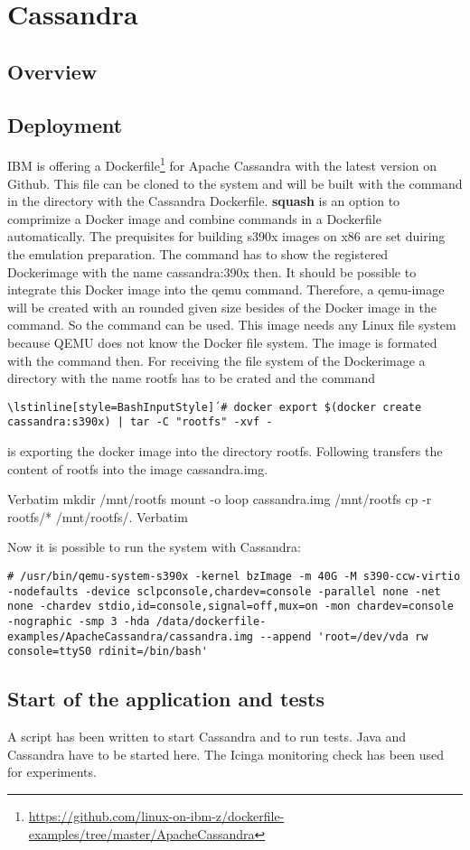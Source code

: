 \chapter{Cassandra}\label{ch:cassandra}

\section{Overview}

\section{Deployment}

IBM is offering a Dockerfile\footnote{\url{https://github.com/linux-on-ibm-z/dockerfile-examples/tree/master/ApacheCassandra}} for Apache Cassandra with the latest version on Github. This file can be cloned to the system and will be built with the command  in the directory with the Cassandra Dockerfile. \textbf{squash} is an option to comprimize a Docker image and combine commands in a Dockerfile automatically. The prequisites for building s390x images on x86 are set duiring the emulation preparation. The command  has to show the registered Dockerimage with the name cassandra:390x then. It should be possible to integrate this Docker image into the qemu command. Therefore, a qemu-image will be created with an rounded given size besides of the Docker image in the  command. So the command  can be used. This image needs any Linux file system because QEMU does not know the Docker file system. The image is formated with the command  then. For receiving the file system of the Dockerimage a directory with the name rootfs has to be crated and the command
\begin{lstlisting}[style=BashInputStyle]
\lstinline[style=BashInputStyle]´# docker export $(docker create cassandra:s390x) | tar -C "rootfs" -xvf -
 \end{lstlisting}
 is exporting the docker image into the directory rootfs. Following transfers the content of rootfs into the image cassandra.img.

{Verbatim}
mkdir /mnt/rootfs
mount -o loop cassandra.img /mnt/rootfs
cp -r rootfs/* /mnt/rootfs/.
{Verbatim}

Now it is possible to run the system with Cassandra: \\
\begin{lstlisting}[style=BashInputStyle]
 # /usr/bin/qemu-system-s390x -kernel bzImage -m 40G -M s390-ccw-virtio -nodefaults -device sclpconsole,chardev=console -parallel none -net none -chardev stdio,id=console,signal=off,mux=on -mon chardev=console -nographic -smp 3 -hda /data/dockerfile-examples/ApacheCassandra/cassandra.img --append 'root=/dev/vda rw console=ttyS0 rdinit=/bin/bash' 
 \end{lstlisting}

\section{Start of the application and tests}

A script has been written to start Cassandra and to run tests. Java and Cassandra have to be started here. The Icinga monitoring check has been used for experiments.
